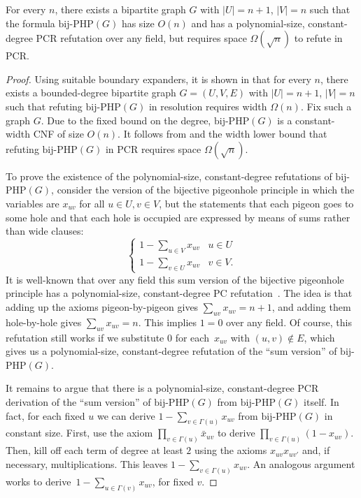 \documentclass{toc}
\begin{document}
\begin{theorem}
For every $n$, there exists a bipartite graph $G$ with $|U| = n+1$, 
$|V| =n$ such that the formula $\mathrm{bij}$-$\mathrm{PHP}(G)$ has size $O(n)$
and has a polynomial-size, constant-degree PCR refutation over any field, but requires space $\Omega(\sqrt n)$ to refute in PCR.
\end{theorem}

\begin{proof}
Using suitable boundary expanders, it is shown in \cite[Section 4]{DBLP:journals/fuin/ItsyksonOSS16} that for every $n$, 
there exists a bounded-degree bipartite graph $G=(U,V,E)$ with $|U| = n+1$, $|V| =n$ such that
refuting $\mathrm{bij}$-$\mathrm{PHP}(G)$ in resolution requires width $\Omega(n)$. Fix such a graph $G$.
Due to the fixed bound on the degree, $\mathrm{bij}$-$\mathrm{PHP}(G)$ is a constant-width CNF
of size $O(n)$. It follows from  and the width lower bound
that refuting $\mathrm{bij}$-$\mathrm{PHP}(G)$ in PCR requires space $\Omega(\sqrt n)$.

To prove the existence of the polynomial-size, constant-degree refutations of 
$\mathrm{bij}$-$\mathrm{PHP}(G)$, consider the version of the bijective pigeonhole principle 
in which the variables are $x_{uv}$ for all $u \in U, v \in V$,  
but the statements that each pigeon goes to some hole and that each hole 
is occupied are expressed by means of sums rather than wide clauses:
\[
\left \{
\begin{array}{ll}
1 - \sum_{u \in V} x_{uv}   & u \in U \\
1 - \sum_{v \in U} x_{uv} & v \in V. 
\end{array}
\right.
\]
It is well-known that over any field this sum version of the bijective pigeonhole principle %
has a polynomial-size, constant-degree PC refutation~\cite{riis}. The idea is that adding up the axioms
pigeon-by-pigeon gives $\sum_{uv} x_{uv} = n+1$, and adding them hole-by-hole 
gives $\sum_{uv} x_{uv} = n$. This implies $1 = 0$ over any field. Of course,
this refutation still works if we substitute $0$ for each~$x_{uv}$ with $(u,v) \notin E$,
which gives us a polynomial-size, constant-degree refutation of the ``sum version''
of $\mathrm{bij}$-$\mathrm{PHP}(G)$.

It remains to argue that there is a polynomial-size, constant-degree PCR derivation 
of the ``sum version'' of $\mathrm{bij}$-$\mathrm{PHP}(G)$ from
$\mathrm{bij}$-$\mathrm{PHP}(G)$ itself. 
In fact, for each fixed $u$ we can derive $1 - \sum_{v \in \Gamma(u)} x_{uv}$  
 from $\mathrm{bij}$-$\mathrm{PHP}(G)$
in 
constant size. 
First, use the axiom $\prod_{v \in \Gamma(u)}\bar x_{uv}$ 
to derive $\prod_{v \in \Gamma(u)}(1-x_{uv})$. 
Then, kill off each term of degree at least $2$ using the axioms $x_{uv}x_{uv'}$ and, if necessary, multiplications.
This leaves $1 - \sum_{v \in \Gamma(u)} x_{uv}$.
An analogous argument works to derive~$1 - \sum_{u \in \Gamma(v)} x_{uv}$, for fixed $v$.
\end{proof}
\end{document}
